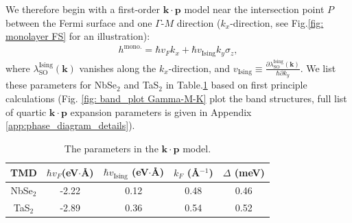 We therefore begin with a first-order $\bm{k\cdot p}$ model near the intersection point $P$ between the Fermi surface and one $\Gamma$-$M$ direction ($k_x$-direction, see Fig.\ref{fig: monolayer FS} for an illustration):
\begin{align}
    h^{\text{mono.}}=\hbar v_F k_x + \hbar v_{\text{Ising}} k_y\sigma_z,\label{eqn:1layer}
\end{align}
where $\lambda^{\text{Ising}}_{\mathrm{SO}}(\bm k)$ vanishes along the $k_x$-direction, and $v_{\text{Ising}}\equiv \frac{\partial \lambda^{\text{Ising}}_{\mathrm{SO}}(\bm k)}{\hbar \partial k_y}$. We list these parameters for NbSe$_2$ and TaS$_2$ in Table.\ref{table:parameters} based on first principle calculations (Fig. \ref{fig: band_plot Gamma-M-K} plot the band structures, full list of quartic $\bm{k\cdot p}$ expansion parameters is given in Appendix \ref{app:phase_diagram_details}).
\begin{table}
    \centering
    \begin{tabular}{|c|c|c|c|c|}
        \hline
        TMD  & $\hbar v_F$(eV$\cdot$\AA) & $\hbar v_{\text{Ising}}$ (eV$\cdot$\AA)  & $k_F$ (\AA$^{-1}$) &$\Delta$ (meV)\\ \hline 
        NbSe$_2$ & -2.22 & 0.12 & 0.48 & 0.46 \\ \hline
        TaS$_2$ & -2.89 & 0.36 & 0.54 & 0.52 \\ \hline
    \end{tabular}
    \caption{The parameters in the $\bm{k\cdot p}$ model.}
    \label{table:parameters}
\end{table}

